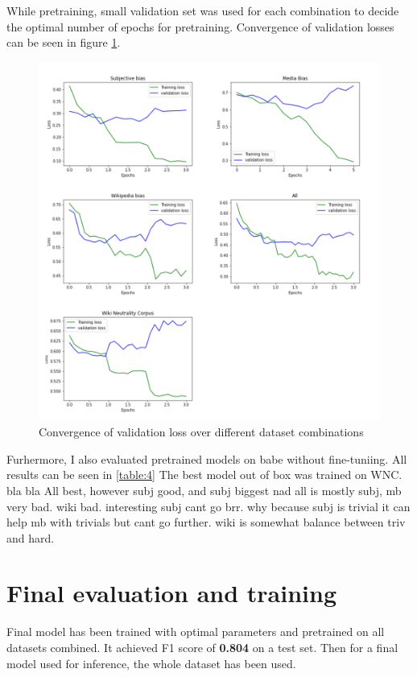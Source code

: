 While pretraining, small validation set was used for each combination to decide the optimal number of epochs for pretraining. Convergence of validation losses can be seen in figure \ref{fig:all_losses}.
\begin{figure}
  \includegraphics[scale=0.5]{my_modules/multimedia/all_losses.png}
  \caption{Convergence of validation loss over different dataset combinations}
  \label{fig:all_losses}
\end{figure}

Furhermore, I also evaluated pretrained models on babe without fine-tuniing. All results can be seen in \ref{table:4}
The best model out of box was trained on WNC. bla bla All best, however subj good, and subj biggest nad all is mostly subj, mb very bad. wiki bad. interesting subj cant go brr. why because subj is trivial it can help mb with trivials but cant go further. wiki is somewhat balance between triv and hard.

\section{Final evaluation and training}
Final model has been trained with optimal parameters and pretrained on all datasets combined. It achieved F1 score of \textbf{0.804} on a test set. Then for a final model used for inference, the whole dataset has been used.


